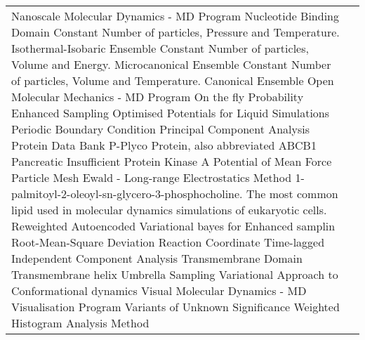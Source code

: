 \begin{center}
\begin{bfseries}
\begin{longtable}{@{}p{3cm}@{}p{\dimexpr\textwidth-1cm\relax}@{}}
\nomenclature{${\small NAMD}$}     {Nanoscale Molecular Dynamics - MD Program}
\nomenclature{${\small NBD}$}      {Nucleotide Binding Domain}
\nomenclature{${\small NPT}$}      {Constant Number of particles, Pressure and Temperature. Isothermal-Isobaric Ensemble}
\nomenclature{${\small NVE}$}      {Constant Number of particles, Volume and Energy. Microcanonical Ensemble}
\nomenclature{${\small NVT}$}      {Constant Number of particles, Volume and Temperature. Canonical Ensemble}
\nomenclature{${\small OpenMM}$}   {Open Molecular Mechanics - MD Program}
\nomenclature{${\small OPES}$}     {On the fly Probability Enhanced Sampling}
\nomenclature{${\small OPLS}$}     {Optimised Potentials for Liquid Simulations}
\nomenclature{${\small PBC}$}      {Periodic Boundary Condition}
\nomenclature{${\small PCA}$}      {Principal Component Analysis}
\nomenclature{${\small PDB}$}      {Protein Data Bank}
\nomenclature{${\small PGP}$}      {P-Plyco Protein, also abbreviated ABCB1}
\nomenclature{${\small PI}$}       {Pancreatic Insufficient}
\nomenclature{${\small PKA}$}      {Protein Kinase A}
\nomenclature{${\small PMF}$}      {Potential of Mean Force}
\nomenclature{${\small PME}$}      {Particle Mesh Ewald - Long-range Electrostatics Method}
\nomenclature{${\small POPC}$}     {1-palmitoyl-2-oleoyl-sn-glycero-3-phosphocholine. The most common lipid used in molecular dynamics simulations of eukaryotic cells.}
\nomenclature{${\small RAVE}$}     {Reweighted Autoencoded Variational bayes for Enhanced samplin}
\nomenclature{${\small RMSD}$}     {Root-Mean-Square Deviation}
\nomenclature{${\small RC}$}       {Reaction Coordinate}
\nomenclature{${\small TICA}$}     {Time-lagged Independent Component Analysis}
\nomenclature{${\small TMD}$}     {Transmembrane Domain}
\nomenclature{${\small TMH}$}     {Transmembrane helix}
\nomenclature{${\small US}$}       {Umbrella Sampling}
\nomenclature{${\small VAC}$}      {Variational Approach to Conformational dynamics}
\nomenclature{${\small VMD}$}      {Visual Molecular Dynamics - MD Visualisation Program}
\nomenclature{${\small VUS}$}      {Variants of Unknown Significance}
\nomenclature{${\small WHAM}$}     {Weighted Histogram Analysis Method}
\end{longtable}
\end{bfseries}
\end{center}
